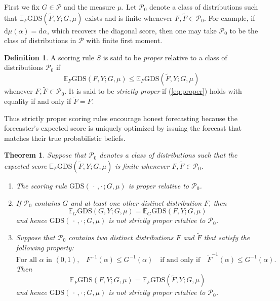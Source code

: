 \documentclass[10pt]{article} %
\theoremstyle{theorem}
\newtheorem{thm}{Theorem}
\theoremstyle{definition}
\newtheorem{defn}{Definition}
\newcommand{\EEE}{\mathbb{E}}
\newcommand{\dd}{\mathrm{d}}
\newcommand{\GDS}{\mathrm{GDS}}
\newcommand{\twocdots}{\,\cdot\,,\cdot\,}
\begin{document}
First we fix $G\in\mathcal{P}$ and the measure $\mu$. Let $\mathcal{P}_0$ denote a class of distributions such that $\EEE_F \GDS(\tilde{F},Y;G,\mu)$ exists and is finite whenever $F,\tilde{F}\in\mathcal{P}_0$. For example, if $\dd\mu(\alpha)=\dd\alpha$, which recovers the diagonal score, then one may take $\mathcal{P}_0$ to be the class of distributions in $\mathcal{P}$ with finite first moment.

\begin{defn}
A scoring rule $S$ is said to be \textit{proper} relative to a class of distributions $\mathcal{P}_0$ if 
\begin{equation}\label{eq:proper}
\EEE_F\GDS(F,Y;G,\mu) \leq \EEE_F\GDS(\tilde{F},Y;G,\mu)
\end{equation}
whenever $F,\tilde{F}\in\mathcal{P}_0$. It is said to be \textit{strictly proper} if (\ref{eq:proper}) holds with equality if and only if $\tilde{F}=F$.
\end{defn}

Thus strictly proper scoring rules encourage honest forecasting \citep{gneiting2007strictly} because the forecaster's expected score is uniquely optimized by issuing the forecast that matches their true probabilistic beliefs.


\begin{thm}\label{thm:proper not strict}
Suppose that $\mathcal{P}_0$ denotes a class of distributions such that the expected score $\EEE_F \GDS(\tilde{F},Y;G,\mu)$ is finite whenever $F,\tilde{F}\in\mathcal{P}_0$.
\begin{enumerate}
\item[(i)] The scoring rule $\GDS(\twocdots;G,\mu)$ is proper relative to $\mathcal{P}_0$.
\item[(ii)] If $\mathcal{P}_0$ contains $G$ and at least one other distinct distribution $F$, then
\begin{equation}\label{eq:proper not strict}
\EEE_G\GDS(G,Y;G,\mu) = \EEE_G\GDS(F,Y;G,\mu)
\end{equation}
and hence $\GDS(\twocdots;G,\mu)$ is not strictly proper relative to $\mathcal{P}_0$.
\item[(iii)] Suppose that $\mathcal{P}_0$ contains two distinct distributions $F$ and $\tilde{F}$ that satisfy the following property:
\begin{equation}\label{eq:same sign condition}
\text{For all $\alpha$ in $(0,1)$,}\quad  F^{-1}(\alpha) \leq G^{-1}(\alpha) \quad \text{if and only if}\quad \tilde{F}^{-1}(\alpha) \leq G^{-1}(\alpha).
\end{equation}
Then
\[
\EEE_F\GDS(F,Y;G,\mu) = \EEE_F\GDS(\tilde{F},Y;G,\mu)
\]
and hence $\GDS(\twocdots;G,\mu)$ is not strictly proper relative to $\mathcal{P}_0$.
\end{enumerate}
\end{thm}
\end{document}

